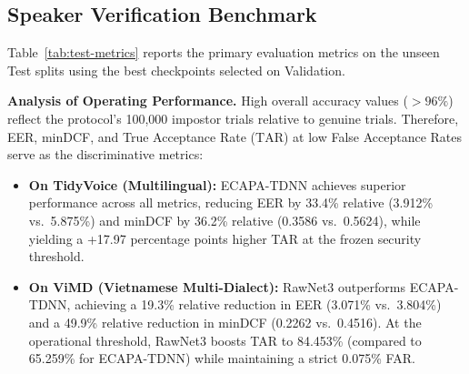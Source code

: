 \subsection{Speaker Verification Benchmark}

Table~\ref{tab:test-metrics} reports the primary evaluation metrics on the unseen Test splits using the best checkpoints selected on Validation.

\begin{table}[H]
\centering
{}
\caption{Final test performance on TidyVoice and ViMD. Thresholds are calibrated at $\text{FAR} = 0.1\%$ on the Validation split and evaluated once on the Test split.}
\label{tab:test-metrics}
\end{table}

\textbf{Analysis of Operating Performance.} High overall accuracy values ($>96\%$) reflect the protocol's 100{,}000 impostor trials relative to genuine trials. Therefore, EER, minDCF, and True Acceptance Rate ($\text{TAR}$) at low False Acceptance Rates serve as the discriminative metrics:
\begin{itemize}
    \item \textbf{On TidyVoice (Multilingual):} ECAPA-TDNN achieves superior performance across all metrics, reducing EER by 33.4\% relative (3.912\% vs.\ 5.875\%) and minDCF by 36.2\% relative (0.3586 vs.\ 0.5624), while yielding a +17.97 percentage points higher TAR at the frozen security threshold.
    \item \textbf{On ViMD (Vietnamese Multi-Dialect):} RawNet3 outperforms ECAPA-TDNN, achieving a 19.3\% relative reduction in EER (3.071\% vs.\ 3.804\%) and a 49.9\% relative reduction in minDCF (0.2262 vs.\ 0.4516). At the operational threshold, RawNet3 boosts TAR to 84.453\% (compared to 65.259\% for ECAPA-TDNN) while maintaining a strict 0.075\% FAR.
\end{itemize}

